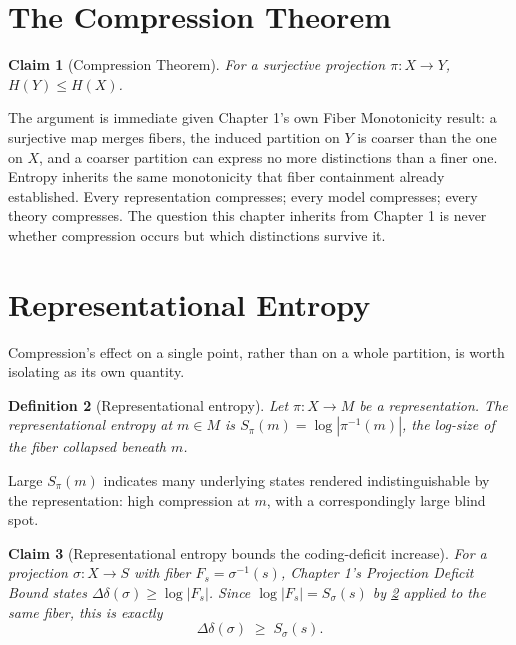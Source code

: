\documentclass[12pt]{report}
\newtheorem{definition}{Definition}[section]
\newtheorem{claim}[definition]{Claim}
\newcommand{\Ddelta}{\ensuremath{\Delta\delta}}
\begin{document}
\section{The Compression Theorem}
\label{sec:compression}

\begin{claim}[Compression Theorem]
\label{thm:compression}
For a surjective projection $\pi : X \to Y$, $H(Y) \leq H(X)$.
\end{claim}

The argument is immediate given Chapter 1's own Fiber Monotonicity result:
a surjective map merges fibers, the induced partition on $Y$ is coarser
than the one on $X$, and a coarser partition can express no more
distinctions than a finer one. Entropy inherits the same monotonicity
that fiber containment already established. Every representation
compresses; every model compresses; every theory compresses. The
question this chapter inherits from Chapter 1 is never whether
compression occurs but which distinctions survive it.

\section{Representational Entropy}
\label{sec:rep-entropy}

Compression's effect on a single point, rather than on a whole partition,
is worth isolating as its own quantity.

\begin{definition}[Representational entropy]
\label{def:rep-entropy}
Let $\pi : X \to M$ be a representation. The representational entropy at
$m \in M$ is $S_\pi(m) = \log|\pi^{-1}(m)|$, the log-size of the fiber
collapsed beneath $m$.
\end{definition}

Large $S_\pi(m)$ indicates many underlying states rendered
indistinguishable by the representation: high compression at $m$, with a
correspondingly large blind spot.

\begin{claim}[Representational entropy bounds the coding-deficit increase]
\label{claim:bridge}
For a projection $\sigma : X \to S$ with fiber $F_s = \sigma^{-1}(s)$,
Chapter 1's Projection Deficit Bound states $\Ddelta(\sigma) \geq
\log|F_s|$. Since $\log|F_s| = S_\sigma(s)$ by \cref{def:rep-entropy}
applied to the same fiber, this is exactly
\[
\Ddelta(\sigma) \;\geq\; S_\sigma(s).
\]
\end{claim}
\end{document}
